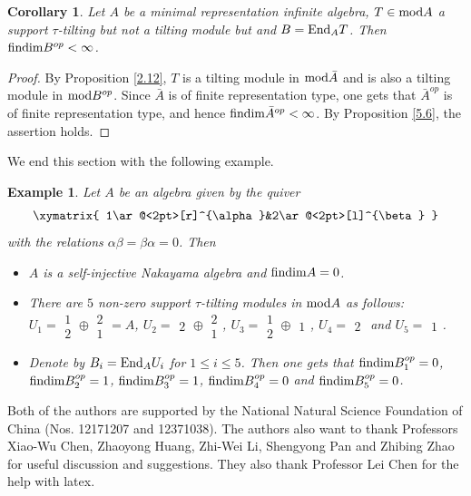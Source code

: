 \documentclass[a4paper]{amsart}
\newtheorem{cor}[thm]{Corollary}
\newtheorem{exm}[thm]{Example}
\theoremstyle{definition}
\theoremstyle{remark}
\numberwithin{equation}{section}
\begin{document}
\begin{cor}\label{5.7} Let $A$ be a minimal representation infinite algebra, $T\in {\rm mod}A$ a support $\tau$-tilting but not a tilting module but and $B={\rm End}_A T$. Then ${\rm findim}B^{op}<\infty$.
\end{cor}

\begin{proof} By Proposition \ref{2.12}, $T$ is a tilting module in ${\rm mod}\bar{A}$ and is also a tilting module in ${\rm mod}B^{op}$. Since $\bar{A}$ is of finite representation type, one gets that $\bar{A}^{op}$ is of finite representation type, and hence ${\rm findim}\bar {A}^{op}<\infty$. By Proposition \ref{5.6}, the assertion holds.
\end{proof}

We end this section with the following example.

\begin{exm}\label{5.8} Let $A$ be an algebra given by the quiver \[\xymatrix{
1\ar@<2pt>[r]^{\alpha}&2\ar@<2pt>[l]^{\beta}
}\]  with the relations $\alpha\beta=\beta\alpha=0$. Then
\begin{itemize}
\item[(1)] $A$ is a self-injective Nakayama algebra and ${\rm findim}A=0$.
\item[(2)] There are $5$ non-zero support $\tau$-tilting modules in ${\rm mod}A$ as follows:
$U_1=\substack{1\\2}\oplus\substack{2\\1}=A$, $U_2=\substack{2}\oplus\substack{2\\1}$, $U_3=\substack{1\\2}\oplus\substack{1}$, $U_4=\substack{2}$ and $U_5=\substack{1}$.
\item[(3)] Denote by $B_i={\rm End}_A U_i$ for $1\leq i\leq 5$. Then one gets that  ${\rm findim }B_1^{op}=0$, ${\rm findim} B_2^{op}=1$, ${\rm findim }B_3^{op}=1$, ${\rm findim }B_4^{op}=0$ and ${\rm findim} B_5^{op}=0$.
\end{itemize}
\end{exm}


\vskip 10pt

  Both of the authors are supported by the National Natural Science Foundation of China (Nos. 12171207 and  12371038). The authors also want to thank Professors Xiao-Wu Chen, Zhaoyong Huang, Zhi-Wei Li, Shengyong Pan and Zhibing Zhao for useful discussion and suggestions. They also thank Professor Lei Chen for the help with latex.
\end{document}
